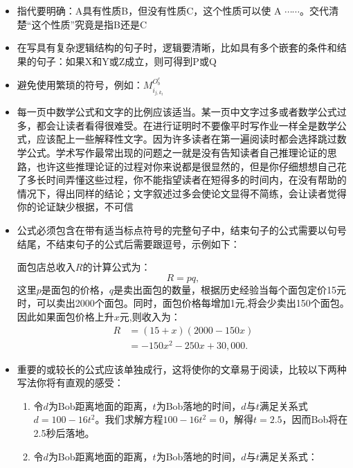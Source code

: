 \documentclass{formatBook}
\begin{document}
\begin{itemize}
    \item 指代要明确：A具有性质B，但没有性质C，这个性质可以使 A $\cdots\cdots$。交代清楚“这个性质”究竟是指B还是C
    \item 在写具有复杂逻辑结构的句子时，逻辑要清晰，比如具有多个嵌套的条件和结果的句子：如果X和Y或Z成立，则可得到P或Q
    \item 避免使用繁琐的符号，例如：$M_{i_{j, k_{t}}}^{O_{b}^{c}}$
    \item 每一页中数学公式和文字的比例应该适当。某一页中文字过多或者数学公式过多，都会让读者看得很难受。在进行证明时不要像平时写作业一样全是数学公式，应该配上一些解释性文字。因为许多读者在第一遍阅读时都会选择跳过数学公式。学术写作最常出现的问题之一就是没有告知读者自己推理论证的思路，也许这些推理论证的过程对你来说都是很显然的，但是你仔细想想自己花了多长时间弄懂这些过程，你不能指望读者在短得多的时间内，在没有帮助的情况下，得出同样的结论；文字叙述过多会使论文显得不简练，会让读者觉得你的论证缺少根据，不可信
    \item 公式必须包含在带有适当标点符号的完整句子中，结束句子的公式需要以句号结尾，不结束句子的公式后需要跟逗号，示例如下：\par
          面包店总收入$R$的计算公式为：
          \begin{equation*}
              R=pq,
          \end{equation*}
          这里$p$是面包的价格，$q$是卖出面包的数量，根据历史经验当每个面包定价15元时，可以卖出2000个面包。同时，面包价格每增加1元,将会少卖出150个面包。因此如果面包价格上升$x$元,则收入为：
          \begin{equation*}
              \begin{split}
                  R&=(15+x)(2000-150x)\\
                  &=-150x^{2}-250x+30,000.
              \end{split}
          \end{equation*}
    \item 重要的或较长的公式应该单独成行，这将使你的文章易于阅读，比较以下两种写法你将有直观的感受：
          \begin{enumerate}
              \item 令$d$为Bob距离地面的距离，$t$为Bob落地的时间，$d$与$t$满足关系式$d = 100 − 16t^{2}$。我们求解方程$100 − 16t^{2} = 0$，解得$t =2.5$，因而Bob将在2.5秒后落地。
              \item 令$d$为Bob距离地面的距离，$t$为Bob落地的时间，$d$与$t$满足关系式：
                    \begin{equation*}

\end{equation*}
\end{enumerate}
\end{itemize}
\end{document}
